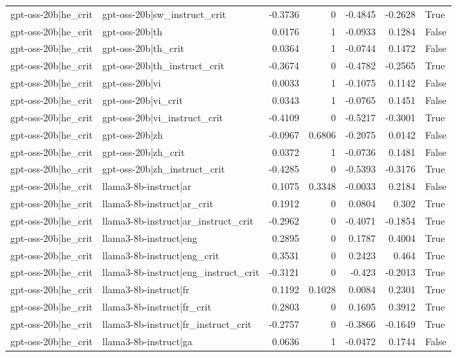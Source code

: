 \begin{table}
\begin{tabular}{l l r r r r l}
gpt-oss-20b|he_crit & gpt-oss-20b|sw_instruct_crit & -0.3736 & 0 & -0.4845 & -0.2628 & True \\
gpt-oss-20b|he_crit & gpt-oss-20b|th & 0.0176 & 1 & -0.0933 & 0.1284 & False \\
gpt-oss-20b|he_crit & gpt-oss-20b|th_crit & 0.0364 & 1 & -0.0744 & 0.1472 & False \\
gpt-oss-20b|he_crit & gpt-oss-20b|th_instruct_crit & -0.3674 & 0 & -0.4782 & -0.2565 & True \\
gpt-oss-20b|he_crit & gpt-oss-20b|vi & 0.0033 & 1 & -0.1075 & 0.1142 & False \\
gpt-oss-20b|he_crit & gpt-oss-20b|vi_crit & 0.0343 & 1 & -0.0765 & 0.1451 & False \\
gpt-oss-20b|he_crit & gpt-oss-20b|vi_instruct_crit & -0.4109 & 0 & -0.5217 & -0.3001 & True \\
gpt-oss-20b|he_crit & gpt-oss-20b|zh & -0.0967 & 0.6806 & -0.2075 & 0.0142 & False \\
gpt-oss-20b|he_crit & gpt-oss-20b|zh_crit & 0.0372 & 1 & -0.0736 & 0.1481 & False \\
gpt-oss-20b|he_crit & gpt-oss-20b|zh_instruct_crit & -0.4285 & 0 & -0.5393 & -0.3176 & True \\
gpt-oss-20b|he_crit & llama3-8b-instruct|ar & 0.1075 & 0.3348 & -0.0033 & 0.2184 & False \\
gpt-oss-20b|he_crit & llama3-8b-instruct|ar_crit & 0.1912 & 0 & 0.0804 & 0.302 & True \\
gpt-oss-20b|he_crit & llama3-8b-instruct|ar_instruct_crit & -0.2962 & 0 & -0.4071 & -0.1854 & True \\
gpt-oss-20b|he_crit & llama3-8b-instruct|eng & 0.2895 & 0 & 0.1787 & 0.4004 & True \\
gpt-oss-20b|he_crit & llama3-8b-instruct|eng_crit & 0.3531 & 0 & 0.2423 & 0.464 & True \\
gpt-oss-20b|he_crit & llama3-8b-instruct|eng_instruct_crit & -0.3121 & 0 & -0.423 & -0.2013 & True \\
gpt-oss-20b|he_crit & llama3-8b-instruct|fr & 0.1192 & 0.1028 & 0.0084 & 0.2301 & True \\
gpt-oss-20b|he_crit & llama3-8b-instruct|fr_crit & 0.2803 & 0 & 0.1695 & 0.3912 & True \\
gpt-oss-20b|he_crit & llama3-8b-instruct|fr_instruct_crit & -0.2757 & 0 & -0.3866 & -0.1649 & True \\
gpt-oss-20b|he_crit & llama3-8b-instruct|ga & 0.0636 & 1 & -0.0472 & 0.1744 & False \\

\end{tabular}
\end{table}
